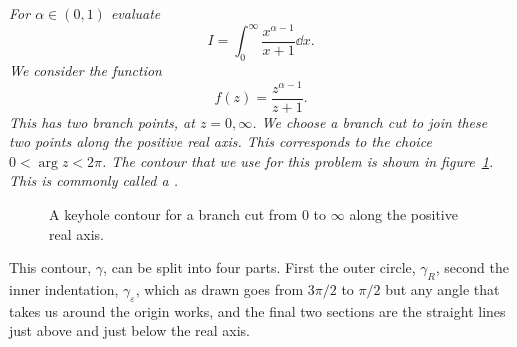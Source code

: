 \documentclass{article}
\begin{document}
    \begin{example}
        \itshape For \(\alpha\in(0, 1)\) evaluate
        \[I = \int_{0}^{\infty} \frac{x^{\alpha - 1}}{x + 1} \dd{x}.\]
        \normalfont
        We consider the function
        \[f(z) = \frac{z^{\alpha - 1}}{z + 1}.\]
        This has two branch points, at \(z = 0, \infty\).
        We choose a branch cut to join these two points along the positive real axis.
        This corresponds to the choice \(0 < \arg z < 2\pi\).
        The contour that we use for this problem is shown in figure~\ref{fig:keyhole contour}.
        This is commonly called a .
        \begin{figure}[ht]
            \centering
            \tikzexternalenable
            \tikzexternaldisable
            \caption{A keyhole contour for a branch cut from \(0\) to \(\infty\) along the positive real axis.}
            \label{fig:keyhole contour}
        \end{figure}
        This contour, \(\gamma\), can be split into four parts.
        First the outer circle, \(\gamma_R\), second the inner indentation, \(\gamma_{\varepsilon}\), which as drawn goes from \(3\pi/2\) to \(\pi/2\) but any angle that takes us around the origin works, and the final two sections are the straight lines just above and just below the real axis.
        

\end{example}
\end{document}
